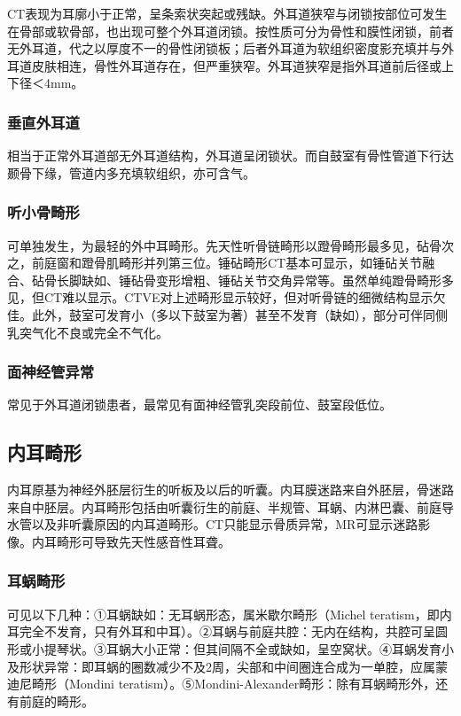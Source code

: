 CT表现为耳廓小于正常，呈条索状突起或残缺。外耳道狭窄与闭锁按部位可发生在骨部或软骨部，也出现可整个外耳道闭锁。按性质可分为骨性和膜性闭锁，前者无外耳道，代之以厚度不一的骨性闭锁板；后者外耳道为软组织密度影充填并与外耳道皮肤相连，骨性外耳道存在，但严重狭窄。外耳道狭窄是指外耳道前后径或上下径＜4mm。

\subsubsection{垂直外耳道}

相当于正常外耳道部无外耳道结构，外耳道呈闭锁状。而自鼓室有骨性管道下行达颞骨下缘，管道内多充填软组织，亦可含气。

\subsubsection{听小骨畸形}

可单独发生，为最轻的外中耳畸形。先天性听骨链畸形以蹬骨畸形最多见，砧骨次之，前庭窗和蹬骨肌畸形并列第三位。锤砧畸形CT基本可显示，如锤砧关节融合、砧骨长脚缺如、锤砧骨变形增粗、锤砧关节交角异常等。虽然单纯蹬骨畸形多见，但CT难以显示。CTVE对上述畸形显示较好，但对听骨链的细微结构显示欠佳。此外，鼓室可发育小（多以下鼓室为著）甚至不发育（缺如），部分可伴同侧乳突气化不良或完全不气化。

\subsubsection{面神经管异常}

常见于外耳道闭锁患者，最常见有面神经管乳突段前位、鼓室段低位。

\subsection{内耳畸形}

内耳原基为神经外胚层衍生的听板及以后的听囊。内耳膜迷路来自外胚层，骨迷路来自中胚层。内耳畸形包括由听囊衍生的前庭、半规管、耳蜗、内淋巴囊、前庭导水管以及非听囊原因的内耳道畸形。CT只能显示骨质异常，MR可显示迷路影像。内耳畸形可导致先天性感音性耳聋。

\subsubsection{耳蜗畸形}

可见以下几种：①耳蜗缺如：无耳蜗形态，属米歇尔畸形（Michel
teratism，即内耳完全不发育，只有外耳和中耳）。②耳蜗与前庭共腔：无内在结构，共腔可呈圆形或小提琴状。③耳蜗大小正常：但其间隔不全或缺如，呈空窝状。④耳蜗发育小及形状异常：即耳蜗的圈数减少不及2周，尖部和中间圈连合成为一单腔，应属蒙迪尼畸形（Mondini
teratism）。⑤Mondini-Alexander畸形：除有耳蜗畸形外，还有前庭的畸形。

